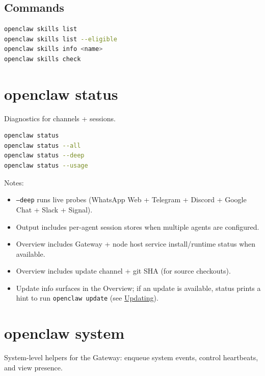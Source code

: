 \subsection{Commands}


\begin{lstlisting}[language=bash]
openclaw skills list
openclaw skills list --eligible
openclaw skills info <name>
openclaw skills check
\end{lstlisting}



\clearpage

\section{openclaw status}


Diagnostics for channels + sessions.

\begin{lstlisting}[language=bash]
openclaw status
openclaw status --all
openclaw status --deep
openclaw status --usage
\end{lstlisting}


Notes:

\begin{itemize}
  \item \texttt{--deep} runs live probes (WhatsApp Web + Telegram + Discord + Google Chat + Slack + Signal).
  \item Output includes per-agent session stores when multiple agents are configured.
  \item Overview includes Gateway + node host service install/runtime status when available.
  \item Overview includes update channel + git SHA (for source checkouts).
  \item Update info surfaces in the Overview; if an update is available, status prints a hint to run \texttt{openclaw update} (see \href{/install/updating}{Updating}).
\end{itemize}



\clearpage

\section{openclaw system}


System-level helpers for the Gateway: enqueue system events, control heartbeats,
and view presence.

